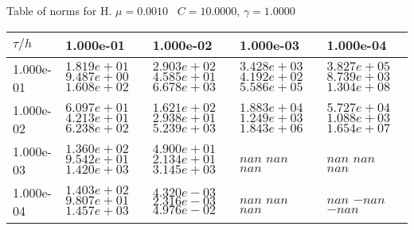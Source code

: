 \begin{center}
Table of norms for H. $\mu = 0.0010$ \, $C = 10.0000$, $\gamma = 1.0000$
  
\begin{tabular}{|p{1in}|p{1in}|p{1in}|p{1in}|p{1in}|} \hline
$\tau / h$ &1.000e-01 &1.000e-02 &1.000e-03 &1.000e-04 \\ \hline 
1.000e-01 & $1.819e+01$  $9.487e+00$  $1.608e+02$  & $2.903e+02$  $4.585e+01$  $6.678e+03$  & $3.428e+03$  $4.192e+02$  $5.586e+05$  & $3.827e+05$  $8.739e+03$  $1.304e+08$  \\ \hline 
1.000e-02 & $6.097e+01$  $4.213e+01$  $6.238e+02$  & $1.621e+02$  $2.938e+01$  $5.239e+03$  & $1.883e+04$  $1.249e+03$  $1.843e+06$  & $5.727e+04$  $1.088e+03$  $1.654e+07$  \\ \hline 
1.000e-03 & $1.360e+02$  $9.542e+01$  $1.420e+03$  & $4.900e+01$  $2.134e+01$  $3.145e+03$  & $nan$  $nan$  $nan$  & $nan$  $nan$  $nan$  \\ \hline 
1.000e-04 & $1.403e+02$  $9.807e+01$  $1.457e+03$  & $4.320e-03$  $2.316e-03$  $4.976e-02$  & $nan$  $nan$  $nan$  & $nan$  $-nan$  $-nan$  \\ \hline 

\end{tabular}\\[20pt]
\end{center}
